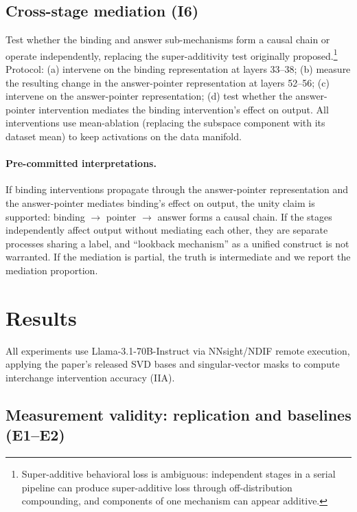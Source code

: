 \documentclass{article}
\begin{document}
\subsection{Cross-stage mediation (I6)}
\label{sec:mediation}

Test whether the binding and answer sub-mechanisms form a causal chain or operate independently, replacing the super-additivity test originally proposed.\footnote{Super-additive behavioral loss is ambiguous: independent stages in a serial pipeline can produce super-additive loss through off-distribution compounding, and components of one mechanism can appear additive.} Protocol: (a) intervene on the binding representation at layers 33--38; (b) measure the resulting change in the answer-pointer representation at layers 52--56; (c) intervene on the answer-pointer representation; (d) test whether the answer-pointer intervention mediates the binding intervention's effect on output. All interventions use mean-ablation (replacing the subspace component with its dataset mean) to keep activations on the data manifold.

\paragraph{Pre-committed interpretations.} If binding interventions propagate through the answer-pointer representation and the answer-pointer mediates binding's effect on output, the unity claim is supported: binding $\to$ pointer $\to$ answer forms a causal chain. If the stages independently affect output without mediating each other, they are separate processes sharing a label, and ``lookback mechanism'' as a unified construct is not warranted. If the mediation is partial, the truth is intermediate and we report the mediation proportion.


\section{Results}
\label{sec:results}

All experiments use Llama-3.1-70B-Instruct via NNsight/NDIF remote execution, applying the paper's released SVD bases and singular-vector masks to compute interchange intervention accuracy (IIA).

\subsection{Measurement validity: replication and baselines (E1--E2)}
\end{document}
